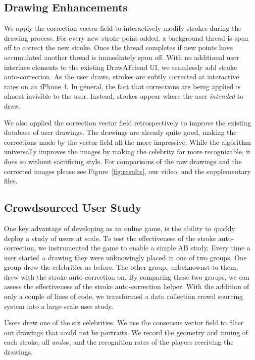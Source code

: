 \subsection {Drawing Enhancements}

We apply the correction vector field to interactively modify strokes during the drawing process. For every new stroke point added, a background thread is spun off to correct the new stroke. Once the thread completes if new points have accumulated another thread is immediately spun off. With no additional user interface elements to the existing DrawAFriend UI, we seamlessly add stroke auto-correction. As the user draws, strokes are subtly corrected at interactive rates on an iPhone 4. In general, the fact that corrections are being applied is almost invisible to the user. Instead, strokes appear where the user {\em intended} to draw.


We also applied the correction vector field retrospectively to improve the existing database of user drawings. The drawings are already quite good, making the corrections made by the vector field all the more impressive.  While the algorithm universally improves the images by making the celebrity far more recognizable, it does so without sacrificing style. For comparisons of the raw drawings and the corrected images please see Figure~\ref{fig:results}, our video, and the supplementary files.

\subsection {Crowdsourced User Study}

One key advantage of developing \daf as an online game, is the ability to quickly deploy a study of users at scale. To test the effectiveness of the stroke auto-correction, we instrumented the game to enable a simple AB study. Every time a user started a drawing they were unknowingly placed in one of two groups. One group drew the celebrities as before. The other group, unbeknownst to them, drew with the stroke auto-correction on. By comparing these two groups, we can assess the effectiveness of the stroke auto-correction helper. With the addition of only a couple of lines of code, we transformed a data collection crowd sourcing system into a large-scale user study.

Users drew one of the six celebrities. We use the consensus vector field to filter out drawings that could not be portraits. We record the geometry and timing of each stroke, all {\em undo}s, and the recognition rates of the players receiving the drawings.

